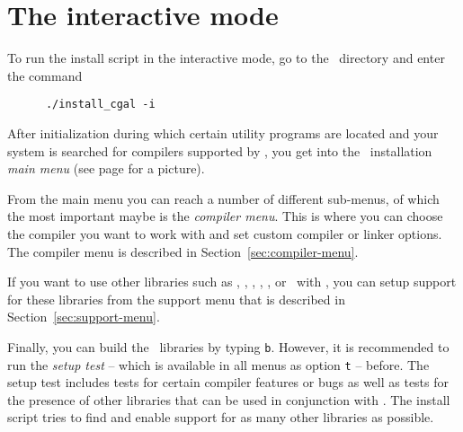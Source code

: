 

\section{The interactive mode}\label{sec:interactive-mode}

To run the install script in the interactive mode, go to the \cgaldir\ 
directory and enter the command
\begin{verbatim}
      ./install_cgal -i
\end{verbatim}

After initialization during which certain utility programs are located
and your system is searched for compilers supported by \cgal, you get
into the \cgal\ installation \textit{main menu} (see page
\pageref{pic:main-menu} for a picture).

From the main menu you can reach a number of different sub-menus, of
which the most important maybe is the \textit{compiler menu}. This is
where you can choose the compiler you want to work with and set custom
compiler or linker options. The compiler menu is described in
Section~\ref{sec:compiler-menu}.

If you want to use other libraries such as \boost, \taucs, \gmp,
\core, \leda, or \qt\ with \cgal, you can setup support for these
libraries from the support menu that is described in
Section~\ref{sec:support-menu}.

Finally, you can build the \cgal\ libraries by typing \texttt{b}.
However, it is recommended to run the \textit{setup test} -- which is
available in all menus as option \texttt{t} -- before. The setup test
includes tests for certain compiler features or bugs as well as tests
for the presence of other libraries that can be used in conjunction
with \cgal. The install script tries to find and enable support for as
many other libraries as possible.

